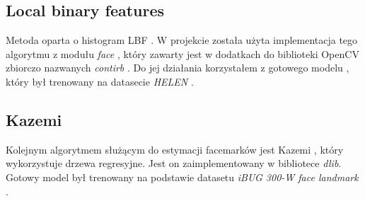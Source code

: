 \subsection{Local binary features}
Metoda oparta o histogram LBF \cite{lbpFacemark}. W projekcie została użyta implementacja tego algorytmu z modułu \textit{face} \cite{opencvcontribface}, który zawarty jest w dodatkach do biblioteki OpenCV zbiorczo nazwanych \textit{contirb} \cite{opencv_contrib}. Do jej działania korzystałem z gotowego modelu \cite{lbpfacemarkmodel}, który był trenowany na datasecie \textit{HELEN} \cite{helen_dataset}.

\subsection{Kazemi}
Kolejnym algorytmem służącym do estymacji facemarków jest Kazemi \cite{kazemi}, który wykorzystuje drzewa regresyjne. Jest on zaimplementowany w bibliotece \textit{dlib}. Gotowy model był trenowany na podstawie datasetu \textit{iBUG 300-W face landmark} \cite{300Ibugdataset}.


